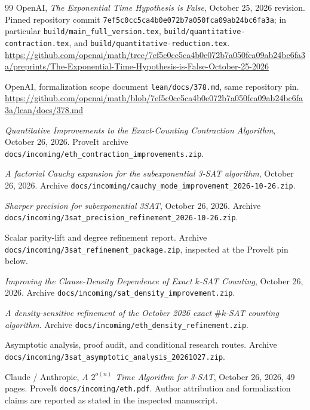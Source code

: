 \documentclass[11pt,letterpaper]{article}
\numberwithin{equation}{section}
\theoremstyle{definition}\newtheorem{definition}[theorem]{Definition}
\theoremstyle{remark}\newtheorem{remark}[theorem]{Remark}
\begin{document}
\begin{thebibliography}{99}\small
{}
OpenAI, \emph{The Exponential Time Hypothesis is False}, October 25, 2026
revision. Pinned repository commit
\texttt{7ef5c0cc5ca4b0e072b7a050fca09ab24bc6fa3a};
in particular \texttt{build/main\_full\_version.tex},
\texttt{build/quantitative-contraction.tex}, and
\texttt{build/quantitative-reduction.tex}.\\
\url{https://github.com/openai/math/tree/7ef5c0cc5ca4b0e072b7a050fca09ab24bc6fa3a/preprints/The-Exponential-Time-Hypothesis-is-False-October-25-2026}

OpenAI, formalization scope document \texttt{lean/docs/378.md},
same repository pin.\\
\url{https://github.com/openai/math/blob/7ef5c0cc5ca4b0e072b7a050fca09ab24bc6fa3a/lean/docs/378.md}

\emph{Quantitative Improvements to the Exact-Counting Contraction Algorithm},
October 26, 2026. ProveIt archive
\nolinkurl{docs/incoming/eth_contraction_improvements.zip}.

\emph{A factorial Cauchy expansion for the subexponential 3-SAT algorithm},
October 26, 2026. Archive
\nolinkurl{docs/incoming/cauchy_mode_improvement_2026-10-26.zip}.

\emph{Sharper precision for subexponential 3SAT},
October 26, 2026. Archive
\nolinkurl{docs/incoming/3sat_precision_refinement_2026-10-26.zip}.

Scalar parity-lift and degree refinement report. Archive
\nolinkurl{docs/incoming/3sat_refinement_package.zip}, inspected at the
ProveIt pin below.

\emph{Improving the Clause-Density Dependence of Exact $k$-SAT Counting},
October 26, 2026. Archive
\nolinkurl{docs/incoming/sat_density_improvement.zip}.

\emph{A density-sensitive refinement of the October 2026 exact
$\#k$-SAT counting algorithm}. Archive
\nolinkurl{docs/incoming/eth_density_refinement.zip}.

Asymptotic analysis, proof audit, and conditional research routes. Archive
\nolinkurl{docs/incoming/3sat_asymptotic_analysis_20261027.zip}.

Claude / Anthropic, \emph{A $2^{o(n)}$ Time Algorithm for 3-SAT},
October 26, 2026, 49 pages. ProveIt \nolinkurl{docs/incoming/eth.pdf}.
Author attribution and formalization claims are reported as stated in
the inspected manuscript.


\end{thebibliography}
\end{document}
